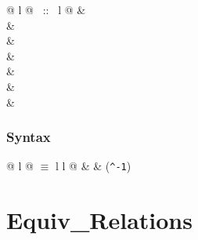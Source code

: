 \begin{isabellebody}
\begin{isamarkuptext}
\begin{supertabular}{@ {} l @ {~::~} l @ {}}
 & \\
 & \\
 & \\
 & \\
 & \\
 & \\
 & \\
\end{supertabular}

\subsubsection*{Syntax}

\begin{tabular}{@ {} l @ {\quad$\equiv$\quad} l l @ {}}
 &  & (\verb$^-1$)
\end{tabular}

\section{Equiv\_Relations}


\end{isamarkuptext}
\end{isabellebody}
